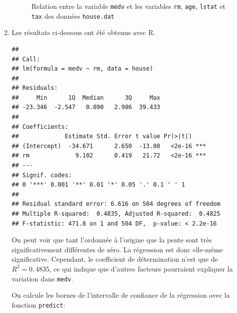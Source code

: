 \begin{solution}{2.17}
\begin{enumerate}
\begin{figure}
\begin{knitrout}
{}



\end{knitrout}
        \caption{Relation entre la variable \texttt{medv} et les
          variables \texttt{rm}, \texttt{age}, \texttt{lstat} et
          \texttt{tax} des données \texttt{house.dat}}
        \label{fig:simple:house}
      \end{figure}
    \item Les résultats ci-dessous ont été obtenus avec \textsf{R}.
\begin{knitrout}
\color{fgcolor}\begin{kframe}
\begin{alltt}
 \hlkwb{<-}  \hlopt{~}   
\end{alltt}
\begin{verbatim}
##
## Call:
## lm(formula = medv ~ rm, data = house)
##
## Residuals:
##     Min      1Q  Median      3Q     Max
## -23.346  -2.547   0.090   2.986  39.433
##
## Coefficients:
##             Estimate Std. Error t value Pr(>|t|)
## (Intercept)  -34.671      2.650  -13.08   <2e-16 ***
## rm             9.102      0.419   21.72   <2e-16 ***
## ---
## Signif. codes:
## 0 '***' 0.001 '**' 0.01 '*' 0.05 '.' 0.1 ' ' 1
##
## Residual standard error: 6.616 on 504 degrees of freedom
## Multiple R-squared:  0.4835,	Adjusted R-squared:  0.4825
## F-statistic: 471.8 on 1 and 504 DF,  p-value: < 2.2e-16
\end{verbatim}
\end{kframe}
\end{knitrout}

      On peut voir que tant l'ordonnée à l'origine que la pente sont
      très significativement différentes de zéro. La régression est
      donc elle-même significative. Cependant, le coefficient de
      détermination n'est que de $R^2 =
      0,4835$, %
      ce qui indique que d'autres facteurs pourraient expliquer la
      variation dans \texttt{medv}.

      On calcule les bornes de l'intervalle de confiance de la
      régression avec la fonction \texttt{predict}:
\begin{knitrout}
\color{fgcolor}\begin{kframe}
\begin{alltt}
 \hlkwb{<-}   \hlstd{=} \hlstd{,}  \hlstd{=} \hlstd{)}
\end{alltt}
\end{kframe}
\end{knitrout}


\end{enumerate}
\end{solution}
